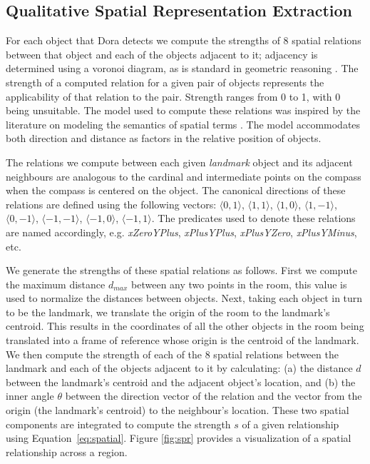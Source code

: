 \subsection{Qualitative Spatial Representation Extraction}

For each object that Dora detects we compute the strengths of 8 spatial relations between that object and each of the objects adjacent to it; adjacency is determined using a voronoi diagram, as is standard in geometric reasoning \cite{Forbus/etal2003}. The strength of a computed relation for a given pair of objects represents the applicability of that relation to the pair.  Strength ranges from 0 to 1, with 0 being unsuitable. The model used to compute these relations was inspired by the literature on modeling the semantics of spatial terms \cite{kelleher/costello:09,kelleher/vanGenabith:2006,regier/carlson:2001,gapp:1994}. The model accommodates both direction and distance as factors in the relative position of objects.

The relations we compute between each given \emph{landmark} object and its adjacent neighbours are analogous to the cardinal and intermediate points on the compass when the compass is centered on the object. The canonical directions of these relations are defined using the following vectors: $\langle0,1\rangle$, $\langle1,1\rangle$, $\langle1,0\rangle$, $\langle1,-1\rangle$, $\langle0,-1\rangle$, $\langle-1,-1\rangle$, $\langle-1,0\rangle$, $\langle-1,1\rangle$. The predicates used to denote these relations are named accordingly, e.g. \textit{xZeroYPlus}, \textit{xPlusYPlus}, \textit{xPlusYZero}, \textit{xPlusYMinus}, etc.

We generate the strengths of these spatial relations as follows. First we compute the maximum distance $d_{max}$ between any two points in the room, this value is used to normalize the distances between objects. Next, taking each object in turn to be the landmark, we translate the origin of the room to the landmark's centroid. This results in the coordinates of all the other objects in the room being translated into a frame of reference whose origin is the centroid of the landmark.  We then compute the strength of each of the 8 spatial relations between the landmark and each of the objects adjacent to it by calculating: (a) the distance $d$ between the landmark's centroid and the adjacent object's location, and (b) the inner angle $\theta$ between the direction vector of the relation and the vector from the origin (the landmark's centroid) to the neighbour's location. These two spatial components are integrated to compute the strength $s$ of a given relationship using Equation~\ref{eq:spatial}. Figure \ref{fig:spr} provides a visualization of a spatial relationship across a region. 

